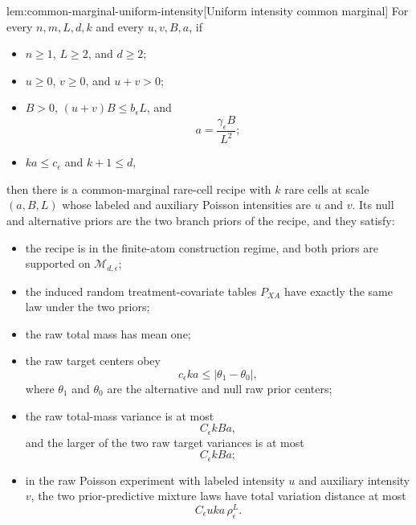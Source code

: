 \documentclass[11pt]{article}
\begin{document}
\begin{lemmav}{lem:common-marginal-uniform-intensity}[Uniform intensity common marginal]
For every \(n,m,L,d,k\) and every \(u,v,B,a\), if
\begin{itemize}
\item \(n\ge1\), \(L\ge2\), and \(d\ge2\);
\item \(u\ge0\), \(v\ge0\), and \(u+v>0\);
\item \(B>0\), \((u+v)B\le b_\epsilon L\), and
\[
a=\frac{\gamma_\epsilon B}{L^2};
\]
\item \(ka\le c_\epsilon\) and \(k+1\le d\),
\end{itemize}
then there is a common-marginal rare-cell recipe with \(k\) rare cells at scale \((a,B,L)\) whose labeled and auxiliary Poisson intensities are \(u\) and \(v\). Its null and alternative priors are the two branch priors of the recipe, and they satisfy:
\begin{itemize}
\item the recipe is in the finite-atom construction regime, and both priors are supported on \(\mathcal M_{d,\epsilon}\);
\item the induced random treatment-covariate tables \(P_{XA}\) have exactly the same law under the two priors;
\item the raw total mass has mean one;
\item the raw target centers obey
\[
c_\epsilon ka
\le
\left|
\theta_1-\theta_0
\right|,
\]
where \(\theta_1\) and \(\theta_0\) are the alternative and null raw prior centers;
\item the raw total-mass variance is at most
\[
C_\epsilon kBa,
\]
and the larger of the two raw target variances is at most
\[
C_\epsilon kBa;
\]
\item in the raw Poisson experiment with labeled intensity \(u\) and auxiliary intensity \(v\), the two prior-predictive mixture laws have total variation distance at most
\[
C_\epsilon uka\,\rho_\epsilon^L .
\]
\end{itemize}
\end{lemmav}
\end{document}
